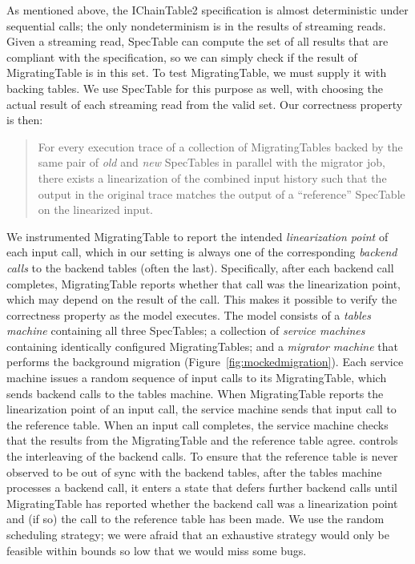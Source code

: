 As mentioned above, the IChainTable2 specification is almost deterministic under sequential calls; the only nondeterminism is in the results of streaming reads.  Given a streaming read, SpecTable can compute the set of all results that are compliant with the specification, so we can simply check if the result of MigratingTable is in this set.  To test MigratingTable, we must supply it with backing tables.  We use SpecTable for this purpose as well, with \psharp choosing the actual result of each streaming read from the valid set.  Our correctness property is then:
\begin{quote}
For every execution trace of a collection of MigratingTables backed by the same pair of \emph{old} and \emph{new} SpecTables in parallel with the migrator job, there exists a linearization of the combined input history such that the output in the original trace matches the output of a ``reference'' SpecTable on the linearized input.
\end{quote}
%
We instrumented MigratingTable to report the intended \emph{linearization point} of each input call, which in our setting is always one of the corresponding \emph{backend calls} to the backend tables (often the last).  Specifically, after each backend call completes, MigratingTable reports whether that call was the linearization point, which may depend on the result of the call.  This makes it possible to verify the correctness property as the model executes.  The model consists of a \psharp \emph{tables machine} containing all three SpecTables; a collection of \emph{service machines} containing identically configured MigratingTables; and a \emph{migrator machine} that performs the background migration (Figure~\ref{fig:mockedmigration}).  Each service machine issues a random sequence of input calls to its MigratingTable, which sends backend calls to the tables machine.  When MigratingTable reports the linearization point of an input call, the service machine sends that input call to the reference table.  When an input call completes, the service machine checks that the results from the MigratingTable and the reference table agree.  \psharp controls the interleaving of the backend calls.  To ensure that the reference table is never observed to be out of sync with the backend tables, after the tables machine processes a backend call, it enters a state that defers further backend calls until MigratingTable has reported whether the backend call was a linearization point and (if so) the call to the reference table has been made.  We use the \psharp random scheduling strategy; we were afraid that an exhaustive strategy would only be feasible within bounds so low that we would miss some bugs.

